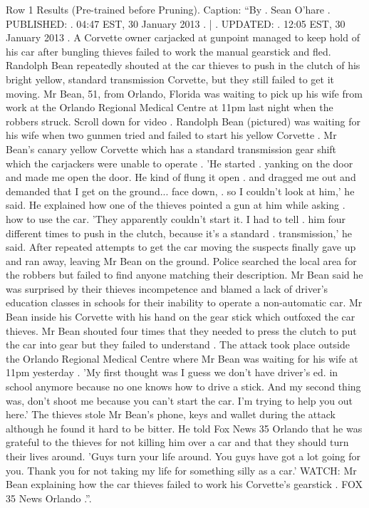 \begin{table}[H]
\centering
\caption{Row 1 Results (Pre-trained before Pruning). \ifshowcaption{}Caption: ``By . Sean O'hare . PUBLISHED: . 04:47 EST, 30 January 2013 . | . UPDATED: . 12:05 EST, 30 January 2013 . A Corvette owner carjacked at gunpoint managed to keep hold of his car after bungling thieves failed to work the manual gearstick and fled. Randolph Bean repeatedly shouted at the car thieves to push in the clutch of his bright yellow, standard transmission Corvette, but they still failed to get it moving. Mr Bean, 51, from Orlando, Florida was waiting to pick up his wife from work at the Orlando Regional Medical Centre at 11pm last night when the robbers struck. Scroll down for video . Randolph Bean (pictured) was waiting for his wife when two gunmen tried and failed to start his yellow Corvette . Mr Bean's canary yellow Corvette which has a standard transmission gear shift which the carjackers were unable to operate . 'He started . yanking on the door and made me open the door. He kind of flung it open . and dragged me out and demanded that I get on the ground... face down, . so I couldn't look at him,' he said. He explained how one of the thieves pointed a gun at him while asking . how to use the car. 'They apparently couldn't start it. I had to tell . him four different times to push in the clutch, because it's a standard . transmission,' he said. After repeated attempts to get the car moving the suspects finally gave up and ran away, leaving Mr Bean on the ground. Police searched the local area for the robbers but failed to find anyone matching their description. Mr Bean said he was surprised by their thieves incompetence and blamed a lack of driver's education classes in schools for their inability to operate a non-automatic car. Mr Bean inside his Corvette with his hand on the gear stick which outfoxed the car thieves. Mr Bean shouted four times that they needed to press the clutch to put the car into gear but they failed to understand . The attack took place outside the Orlando Regional Medical Centre where Mr Bean was waiting for his wife at 11pm yesterday . 'My first thought was I guess we don't have driver's ed. in school anymore because no one knows how to drive a stick. And my second thing was, don't shoot me because you can't start the car. I'm trying to help you out here.' The thieves stole Mr Bean's phone, keys and wallet during the attack although he found it hard to be bitter. He told Fox News 35 Orlando that he was grateful to the thieves for not killing him over a car and that they should turn their lives around. 'Guys turn your life around. You guys have got a lot going for you. Thank you for not taking my life for something silly as a car.' WATCH: Mr Bean explaining how the car thieves failed to work his Corvette's gearstick . FOX 35 News Orlando .''.\fi}

\end{table}
